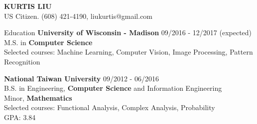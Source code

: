 \documentclass{resume} %
\begin{document}
\begin{center}
{\MakeUppercase{\bf Kurtis Liu}}\\
US Citizen.
(608) 421-4190, liukurtis@gmail.com
\end{center}


\begin{rSection}{Education}
{\bf University of Wisconsin - Madison} \hfill {09/2016 - 12/2017 (expected)}\\ 
M.S. in {\bf Computer Science} \\
Selected courses:  Machine Learning, Computer Vision, Image Processing, Pattern Recognition


{\bf National Taiwan University} \hfill   {09/2012 - 06/2016}\\ 
B.S. in Engineering,  {\bf Computer Science} and Information Engineering\\
Minor, {\bf Mathematics} \\
Selected courses: Functional Analysis, Complex Analysis, Probability\\
GPA: 3.84
\end{rSection}
\end{document}
